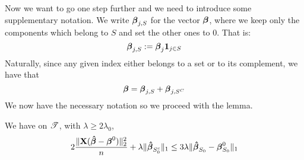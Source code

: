 Now we want to go one step further and we need to introduce some supplementary notation. We write \(\boldsymbol{\beta}_{j,S}\) for the vector \(\boldsymbol{\beta}\), where we keep only the components which belong to \(S\) and set the other ones to 0. That is:
\[
    \boldsymbol{\beta}_{j,S} := \boldsymbol{\beta}_{j} \mathbf{1}_{j \in S}
\]
Naturally, since any given index either belongs to a set or to its complement, we have that
\[
    \boldsymbol{\beta} = \boldsymbol{\beta}_{j,S} + \boldsymbol{\beta}_{j,S^C}
\]
We now have the necessary notation so we proceed with the lemma.
\begin{lemma} %
    \label{lemma: lemma 6.3.}
    We have on $\mathscr{T}$, with $\lambda \geq 2 \lambda_{0}$,
    \begin{equation*}
        2\frac{ \|\mathbf{X} (\boldsymbol{\hat{\beta}}-\boldsymbol{\beta}^{0} ) \|_{2}^{2}}{n} + \lambda \|\boldsymbol{\hat{\beta}}_{S_{0}^{c}} \|_{1} \leq 3 \lambda \|\boldsymbol{\hat{\beta}}_{S_{0}}-\boldsymbol{\beta}_{S_{0}}^{0} \|_{1}
    \end{equation*}
\end{lemma}
